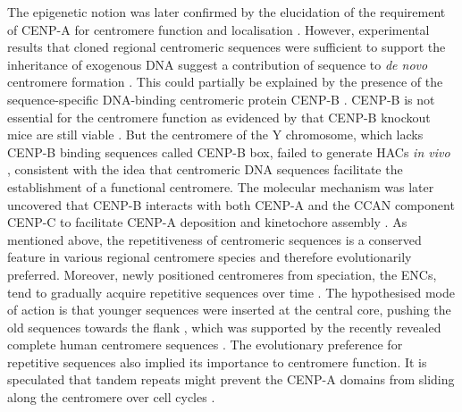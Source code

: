 The epigenetic notion was later confirmed by the elucidation of the requirement of CENP-A for centromere function and localisation \citep{Warburton1997ImmunolocalizationCentromeres, Vafa1997ChromatinPlate, Liu2006MappingCells, Regnier2005CENP-ABubR1, Heun2006, Mendiburo2011, Barnhart2011, Logsdon2015, Logsdon2019}. However, experimental results that cloned regional centromeric sequences were sufficient to support the inheritance of exogenous DNA suggest a contribution of sequence to \textit{de novo} centromere formation \citep{Hahnenberger1989ConstructionPombe., Haaf1992IntegrationSegregation, Harrington1997FormationMicrochromosomes, Ikeno1998ConstructionChromosomes}. This could partially be explained by the presence of the sequence-specific DNA-binding centromeric protein CENP-B \citep{Masumoto1989ASatellite., Muro1992CentromereBox., Earnshaw1985IdentificationScleroderma}. CENP-B is not essential for the centromere function as evidenced by that CENP-B knockout mice are still viable \citep{Kapoor1998TheMice, Perez-Castro1998CentromericAbnormalities, Hudson1998CentromereWeights}. But the centromere of the Y chromosome, which lacks CENP-B binding sequences called CENP-B box, failed to generate HACs \textit{in vivo} \citep{Harrington1997FormationMicrochromosomes, Grimes2002-SatelliteFormation}, consistent with the idea that centromeric DNA sequences facilitate the establishment of a functional centromere. The molecular mechanism was later uncovered that CENP-B interacts with both CENP-A and the CCAN component CENP-C to facilitate CENP-A deposition and kinetochore assembly \citep{Chardon2022CENP-B-mediatedCentromeres, Fachinetti2013, Fachinetti2015, Fujita2015StableNucleosome}. As mentioned above, the repetitiveness of centromeric sequences is a conserved feature in various regional centromere species and therefore evolutionarily preferred. Moreover, newly positioned centromeres from speciation, the ENCs, tend to gradually acquire repetitive sequences over time \citep{Rocchi2011CentromereMammals, Kasai2003ChromosomeEvolution}. The hypothesised mode of action is that younger sequences were inserted at the central core, pushing the old sequences towards the flank \citep{Locke2011ComparativeGenomes, Piras2010UncouplingEquus, Ventura2001CentromereEvolution, Kalitsis2012TheCentromere}, which was supported by the recently revealed complete human centromere sequences \citep{Logsdon2021The8}. The evolutionary preference for repetitive sequences also implied its importance to centromere function. It is speculated that tandem repeats might prevent the CENP-A domains from sliding along the centromere over cell cycles \citep{Nergadze2018BirthDomains}. 

